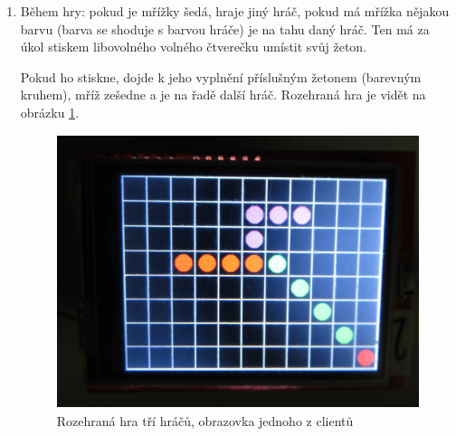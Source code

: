\documentclass[a4paper,12pt, twoside]{article} %
\begin{document}
\begin{enumerate}
\item Během hry: pokud je mřížky šedá, hraje jiný hráč, pokud má mřížka nějakou barvu (barva se shoduje s barvou hráče) je na tahu daný hráč. Ten má za úkol stiskem libovolného volného čtverečku umístit svůj žeton. 

Pokud ho stiskne, dojde k jeho vyplnění příslušným žetonem (barevným kruhem), mříž zešedne a je na řadě další hráč. Rozehraná hra je vidět na obrázku \ref{fig:faze5}.
\begin{figure}[H]
\centering
\includegraphics[height=8cm, angle=-90]{img/foto/faze5.jpg}
\caption{\label{fig:faze5} Rozehraná hra tří hráčů, obrazovka jednoho z clientů}
\end{figure}


\end{enumerate}
\end{document}
